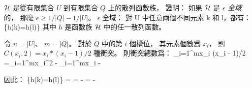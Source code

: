 \DIFFICULT
${\cal H}$ 是從有限集合 $U$ 到有限集合 $Q$ 上的散列函數族，
證明：
如果 ${\cal H}$ 是 \emph{$\epsilon$ 全域}的，
那麼 $\epsilon \ge 1/|Q| - 1/|U|$。
 $\epsilon$ 全域：
對 U 中任意兩個不同元素 k 和 l，都有：
\startformula
\Pr\{h(k)=h(l)\}\le\epsilon
\stopformula
其中 $h$ 是函數族 ${\cal H}$ 中的任一散列函數。
\stopEXERCISE

\startANSWER
令 $n=|U|$、 $m=|Q|$。
對於 $Q$ 中的第 $i$ 個槽位，
其元素個數爲 $x_i$，
則 $C(x_i, 2) = x_i * (x_i - 1) / 2$ 種衝突。
則衝突總數爲：
\startsplitformula\startmathalignment
\NC \sum_{i=1}^{m}x_i (x_i - 1)/2
     =\NC {}\sum_{i=1}^{m}x_i^2 - \sum_{i=1}^{m}x_i \NR
\NC\ge\NC {} - 
\stopmathalignment\stopsplitformula

因此：
\startsplitformula\startmathalignment
\NC \Pr\{h(k)=h(l)\}
    \ge \NC {} \NR
\NC =   \NC {} \NR
\NC \ge \NC {} \NR
\NC =   \NC {} -  \NR
\NC =   \NC {} -  \NR
\stopmathalignment\stopsplitformula
\stopANSWER
